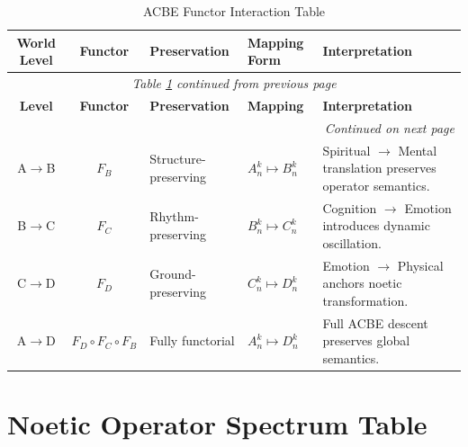 \renewcommand{\arraystretch}{1.25}
\small
\begin{longtable}{c|c|p{2.2cm}|p{2.5cm}|p{4.5cm}}
\caption{ACBE Functor Interaction Table}
\label{tab:acbe-interaction} \\
\toprule
\textbf{World Level}
& \textbf{Functor}
& \textbf{Preservation}
& \textbf{Mapping Form}
& \textbf{Interpretation}
\\
\midrule
\endfirsthead
\multicolumn{5}{c}{\textit{Table \ref{tab:acbe-interaction} continued from previous page}} \\
\toprule
\textbf{Level}
& \textbf{Functor}
& \textbf{Preservation}
& \textbf{Mapping}
& \textbf{Interpretation}
\\
\midrule
\endhead
\midrule
\multicolumn{5}{r}{\textit{Continued on next page}} \\
\endfoot
\bottomrule
\endlastfoot

A$\to$B & $F_B$ & Structure-preserving & $A_n^{k} \mapsto B_n^{k}$ &
Spiritual $\to$ Mental translation preserves operator semantics. \\

B$\to$C & $F_C$ & Rhythm-preserving & $B_n^{k} \mapsto C_n^{k}$ &
Cognition $\to$ Emotion introduces dynamic oscillation. \\

C$\to$D & $F_D$ & Ground-preserving & $C_n^{k} \mapsto D_n^{k}$ &
Emotion $\to$ Physical anchors noetic transformation. \\

A$\to$D & $F_D \circ F_C \circ F_B$ & Fully functorial & $A_n^{k} \mapsto D_n^{k}$ &
Full ACBE descent preserves global semantics. \\

\end{longtable}
\normalsize

\section{Noetic Operator Spectrum Table}

